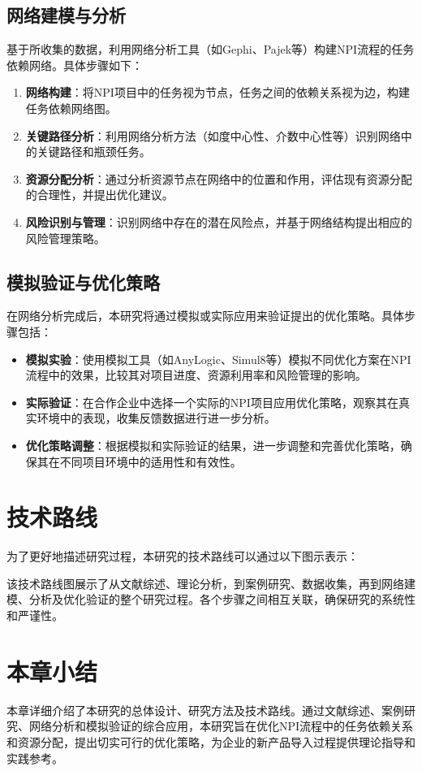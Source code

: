 \subsection{网络建模与分析}
基于所收集的数据，利用网络分析工具（如Gephi、Pajek等）构建NPI流程的任务依赖网络。具体步骤如下：
\begin{enumerate}
    \item \textbf{网络构建}：将NPI项目中的任务视为节点，任务之间的依赖关系视为边，构建任务依赖网络图。
    \item \textbf{关键路径分析}：利用网络分析方法（如度中心性、介数中心性等）识别网络中的关键路径和瓶颈任务。
    \item \textbf{资源分配分析}：通过分析资源节点在网络中的位置和作用，评估现有资源分配的合理性，并提出优化建议。
    \item \textbf{风险识别与管理}：识别网络中存在的潜在风险点，并基于网络结构提出相应的风险管理策略。
\end{enumerate}

\subsection{模拟验证与优化策略}
在网络分析完成后，本研究将通过模拟或实际应用来验证提出的优化策略。具体步骤包括：
\begin{itemize}
    \item \textbf{模拟实验}：使用模拟工具（如AnyLogic、Simul8等）模拟不同优化方案在NPI流程中的效果，比较其对项目进度、资源利用率和风险管理的影响。
    \item \textbf{实际验证}：在合作企业中选择一个实际的NPI项目应用优化策略，观察其在真实环境中的表现，收集反馈数据进行进一步分析。
    \item \textbf{优化策略调整}：根据模拟和实际验证的结果，进一步调整和完善优化策略，确保其在不同项目环境中的适用性和有效性。
\end{itemize}

\section{技术路线}
为了更好地描述研究过程，本研究的技术路线可以通过以下图示表示：

该技术路线图展示了从文献综述、理论分析，到案例研究、数据收集，再到网络建模、分析及优化验证的整个研究过程。各个步骤之间相互关联，确保研究的系统性和严谨性。

\section{本章小结}
本章详细介绍了本研究的总体设计、研究方法及技术路线。通过文献综述、案例研究、网络分析和模拟验证的综合应用，本研究旨在优化NPI流程中的任务依赖关系和资源分配，提出切实可行的优化策略，为企业的新产品导入过程提供理论指导和实践参考。
